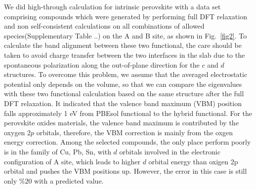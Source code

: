 \documentclass[%
reprint,
superscriptaddress,
citeautoscript,
 amsmath,amssymb,
 aps,
 prl,
floatfix,
]{revtex4-1}
\begin{document}
We did high-through calculation for intrinsic perovskite with a data set comprising compounds which were generated by performing full DFT relaxation and non self-consistent calculations on all combinations of allowed species(Supplementary Table ..) on the A and B site, as shown in Fig.~\ref{fig2}. To calculate the band alignment between these two functional, the care should be taken to avoid charge transfer between the two interfaces in the slab due to the spontaneous polarization along the out-of-plane direction for the $c$ and $d$ structures. To overcome this problem, we assume that the averaged electrostatic potential only depends on the volume, so that we can compare the eigenvalues with these two functional calculation based on the same structure after the full DFT relaxation.  
It indicated that the valence band maximum (VBM) position falls approximately 1 eV from PBEsol functional to the hybrid functional. For the perovskite oxides materials, the valence band maximum is contributed by the oxygen 2$p$ orbitals, therefore, the VBM correction is mainly from the oxgen energy correction.
Among the selected compounds, the only place perform poorly is in the family of Cu, Pb, Sn, with $d$ orbitals involved in the electronic configuration of A site, which leads to higher $d$ orbital energy than oxigen 2p orbital and pushes the VBM positions up. However, the error in this case is still only \%20 with a predicted value.   





\end{document}
